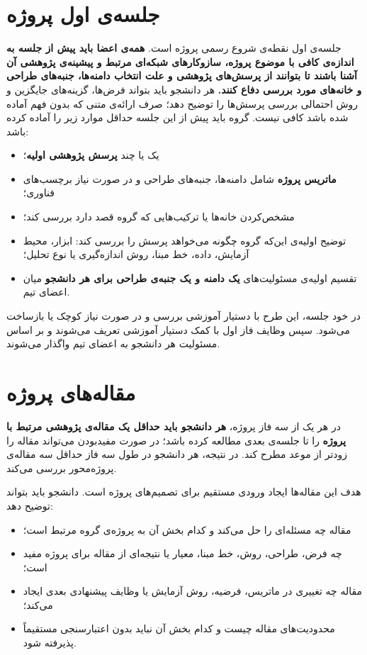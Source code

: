\documentclass[12pt]{article}
\begin{document}
\section{جلسه‌ی اول پروژه}
جلسه‌ی اول نقطه‌ی شروع رسمی پروژه است. \textbf{همه‌ی اعضا باید پیش از جلسه به اندازه‌ی کافی با موضوع پروژه، سازوکارهای شبکه‌ای مرتبط و پیشینه‌ی پژوهشی آن آشنا باشند تا بتوانند از پرسش‌های پژوهشی و علت انتخاب دامنه‌ها، جنبه‌های طراحی و خانه‌های مورد بررسی دفاع کنند.} هر دانشجو باید بتواند فرض‌ها، گزینه‌های جایگزین و روش احتمالی بررسی پرسش‌ها را توضیح دهد؛ صرف ارائه‌ی متنی که بدون فهم آماده شده باشد کافی نیست. گروه باید پیش از این جلسه حداقل موارد زیر را آماده کرده باشد:
\begin{itemize}[label=$\square$]
    \item یک یا چند \textbf{پرسش پژوهشی اولیه}؛
    \item \textbf{ماتریس پروژه} شامل دامنه‌ها، جنبه‌های طراحی و در صورت نیاز برچسب‌های فناوری؛
    \item مشخص‌کردن خانه‌ها یا ترکیب‌هایی که گروه قصد دارد بررسی کند؛
    \item توضیح اولیه‌ی این‌که گروه چگونه می‌خواهد پرسش را بررسی کند: ابزار، محیط آزمایش، داده، خط مبنا، روش اندازه‌گیری یا نوع تحلیل؛
    \item تقسیم اولیه‌ی مسئولیت‌های \textbf{یک دامنه و یک جنبه‌ی طراحی برای هر دانشجو} میان اعضای تیم.
\end{itemize}

در خود جلسه، این طرح با دستیار آموزشی بررسی و در صورت نیاز کوچک یا بازساخت می‌شود. سپس وظایف فاز اول با کمک دستیار آموزشی تعریف می‌شوند و بر اساس مسئولیت هر دانشجو به اعضای تیم واگذار می‌شوند.

\section{مقاله‌های پروژه}
در هر یک از سه فاز پروژه، \textbf{هر دانشجو باید حداقل یک مقاله‌ی پژوهشی مرتبط با پروژه} را تا جلسه‌ی بعدی مطالعه کرده باشد؛ در صورت مفیدبودن می‌تواند مقاله را زودتر از موعد مطرح کند. در نتیجه، هر دانشجو در طول سه فاز حداقل سه مقاله‌ی پروژه‌محور بررسی می‌کند.

هدف این مقاله‌ها ایجاد ورودی مستقیم برای تصمیم‌های پروژه است. دانشجو باید بتواند توضیح دهد:
\begin{itemize}[label=$\bullet$]
    \item مقاله چه مسئله‌ای را حل می‌کند و کدام بخش آن به پروژه‌ی گروه مرتبط است؛
    \item چه فرض، طراحی، روش، خط مبنا، معیار یا نتیجه‌ای از مقاله برای پروژه مفید است؛
    \item مقاله چه تغییری در ماتریس، فرضیه، روش آزمایش یا وظایف پیشنهادی بعدی ایجاد می‌کند؛
    \item محدودیت‌های مقاله چیست و کدام بخش آن نباید بدون اعتبارسنجی مستقیماً پذیرفته شود.
\end{itemize}
\end{document}
